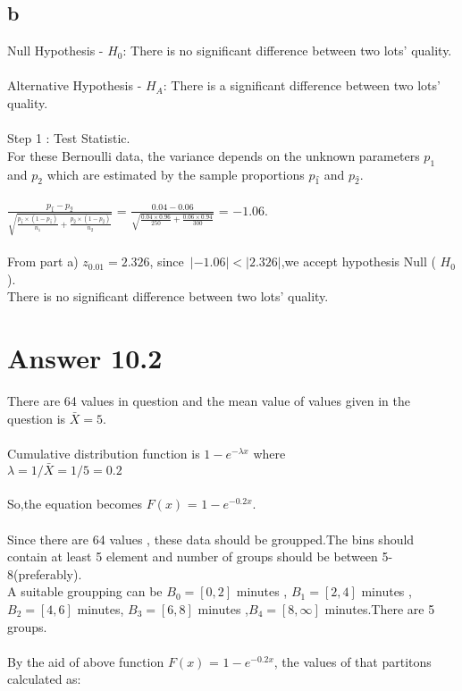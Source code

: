 \documentclass[11pt]{article}
\begin{document}
\subsection*{b}

Null Hypothesis - $H_0$: There is no significant difference between two lots' quality.\\\\
Alternative Hypothesis - $H_A$: There is a significant difference between two lots' quality.\\\\
Step 1 : Test Statistic.\\

For these Bernoulli data, the variance depends on the unknown parameters $p_1$ and 
$p_2$  which are estimated by the sample proportions $p_1\widehat{}$ and $p_2\widehat{}$.\\\\
$\frac{p_1\widehat{} - p_2\widehat{}}{\sqrt{\frac{p_1\widehat{}\times (1-p_1\widehat{})}{n_1} + \frac{p_2\widehat{}\times (1-p_2\widehat{})}{n_2}}}$ = $\frac{0.04 - 0.06}{\sqrt{\frac{0.04\times 0.96}{250} + \frac{0.06\times 0.94}{300}}}$ = $-1.06$.\\\\
From part a) $z_{0.01} = 2.326$, since\ $|-1.06| < |2.326|$,we accept hypothesis Null ( $H_0$ ).\\
There is no significant difference between two lots' quality.\\

\section*{Answer 10.2}

There are 64 values in question and the mean value of values given in the question is $\bar{X} = 5$.\\\\
Cumulative distribution function is $1-e^{-\lambda x}$  where \\ $\lambda = 1/\bar{X}=1/5=0.2$\\\\So,the equation becomes $F(x)$ = $1-e^{-0.2 x}$.\\\\
Since there are 64 values , these data should be groupped.The bins should contain at least 5 element and number of groups should be between 5-8(preferably).\\
A suitable groupping can be $B_0=[0,2]$ minutes , $B_1=[2,4]$ minutes , $B_2=[4,6]$ minutes, $B_3=[6,8]$ minutes ,$B_4=[8,\infty]$ minutes.There are 5 groups.\\\\
By the aid of above function  $F(x)$ = $1-e^{-0.2 x}$, the values of that partitons calculated as:\\
\end{document}
